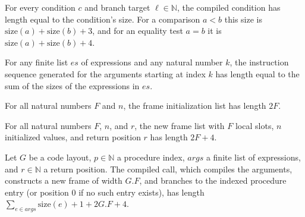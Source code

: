 \begin{theorem}
\label{Light.Compiler.length_compileCond}
\leanok
{}
For every condition $c$ and branch target $\ell\in\mathbb N$, the compiled condition has
length equal to the condition's size. For a comparison $a<b$ this size is
$\mathrm{size}(a)+\mathrm{size}(b)+3$, and for an equality test $a=b$ it is
$\mathrm{size}(a)+\mathrm{size}(b)+4$.
\end{theorem}

\begin{theorem}
\label{Light.Compiler.length_argsCode}
\leanok
{}
For any finite list $es$ of expressions and any natural number $k$, the instruction
sequence generated for the arguments starting at index $k$ has length equal to the sum
of the sizes of the expressions in $es$.
\end{theorem}

\begin{theorem}
\label{Light.Compiler.length_frameInit}
\leanok
{}
For all natural numbers $F$ and $n$, the frame initialization list has length $2F$.
\end{theorem}

\begin{theorem}
\label{Light.Compiler.length_newFrame}
\leanok
{}
For all natural numbers $F$, $n$, and $r$, the new frame list with $F$ local slots, $n$
initialized values, and return position $r$ has length $2F+4$.
\end{theorem}

\begin{theorem}
\label{Light.Compiler.length_callCode}
\leanok
{}
Let $G$ be a code layout, $p\in\mathbb N$ a procedure index, $args$ a finite list of
expressions, and $r\in\mathbb N$ a return position. The compiled call, which compiles
the arguments, constructs a new frame of width $G.F$, and branches to the indexed
procedure entry (or position $0$ if no such entry exists), has length $\sum_{e\in
args}\mathrm{size}(e)+1+2G.F+4$.
\end{theorem}

